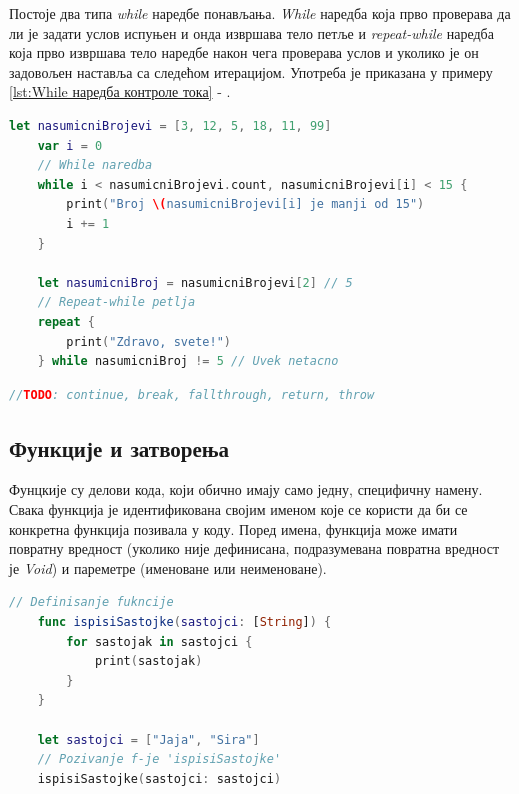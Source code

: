 \documentclass[12pt,oneside]{memoir}
\begin{document}
\indent Постоје два типа \textit{while} наредбе понављања. \textit{While} наредба која прво проверава да ли је задати услов испуњен и онда извршава тело петље и \textit{repeat-while} наредба која прво извршава тело наредбе након чега проверава услов и уколико је он задовољен наставља са следећом итерацијом. Употреба је приказана у примеру \ref{lst:While наредба контроле тока} - . 

\begin{lstlisting}[caption=\textit{{While наредбa контроле тока}}, label={lst:While наредба контроле тока}, language=Swift, frame=single]
    let nasumicniBrojevi = [3, 12, 5, 18, 11, 99]
    var i = 0
    // While naredba
    while i < nasumicniBrojevi.count, nasumicniBrojevi[i] < 15 {
        print("Broj \(nasumicniBrojevi[i] je manji od 15")
        i += 1
    }
    
    let nasumicniBroj = nasumicniBrojevi[2] // 5
    // Repeat-while petlja
    repeat {
        print("Zdravo, svete!")
    } while nasumicniBroj != 5 // Uvek netacno
\end{lstlisting}

\begin{lstlisting}[caption=\textit{{Додаци наредбa контроле тока}}, label={lst:Додаци наредба контроле тока}, language=Swift, frame=single]
    //TODO: continue, break, fallthrough, return, throw
\end{lstlisting}

\subsection{Функције и затворења}

\indent Фунцкије су делови кода, који обично имају само једну, специфичну намену. Свака функција је идентификована својим именом које се користи да би се конкретна функција позивала у коду. Поред имена, функција може имати повратну вредност (уколико није дефинисана, подразумевана повратна вредност је \textit{Void}) и пареметре (именоване или неименоване). %

\begin{lstlisting}[caption=\textit{{Дефинисање и позивање функције са параметром}}, label={lst:Дефинисање и позивање функције са параметром}, language=Swift, frame=single]
    // Definisanje fukncije
    func ispisiSastojke(sastojci: [String]) {
        for sastojak in sastojci {
            print(sastojak)
        }
    }
    
    let sastojci = ["Jaja", "Sira"]
    // Pozivanje f-je 'ispisiSastojke'
    ispisiSastojke(sastojci: sastojci)
\end{lstlisting}
\end{document}
